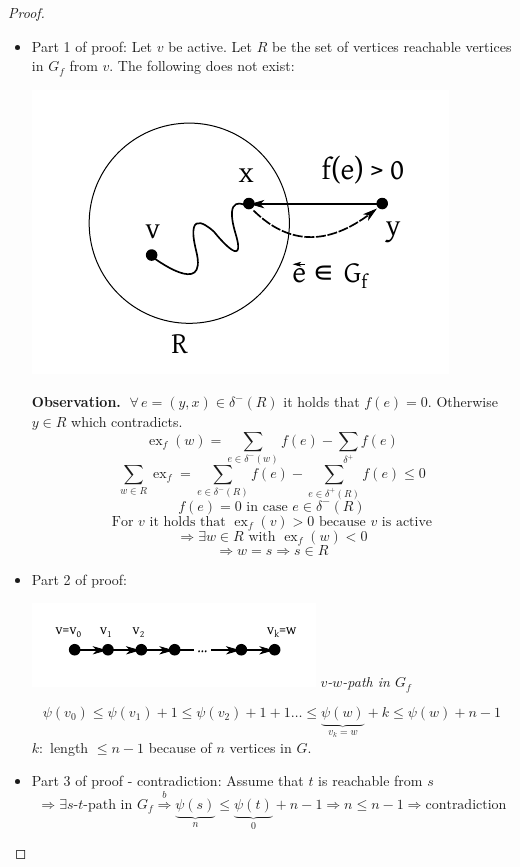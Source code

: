 \documentclass[a4paper]{article}
\theoremstyle{definition}
\newcommand{\gath}[2]{$#1$-$#2$-path} %
\newcommand{\fall}{\;\forall\,}
\begin{document}
\begin{proof}
  \begin{itemize}
    \item Part 1 of proof:
      Let $v$ be active. Let $R$ be the set of vertices reachable vertices in $G_f$ from $v$.
      The following does not exist:
      \begin{center}
        \includegraphics{img/lemma-4_9-proof-a.pdf}
      \end{center}

      \textbf{Observation.} $\fall e = (y, x) \in \delta^-(R)$ it holds that $f(e) = 0$. Otherwise $y \in R$ which contradicts.
      \[ \operatorname{ex}_f(w) = \sum_{e \in \delta^-(w)} f(e) - \sum_{\delta^+} f(e) \]
      \[ \sum_{w \in R} \operatorname{ex}_f = \sum_{e \in \delta^-(R)} f(e) - \sum_{e \in \delta^+(R)} f(e) \leq 0 \]
      \[ f(e) = 0 \text{ in case } e \in \delta^-(R) \]
      \[ \text{For $v$ it holds that } \operatorname{ex}_f(v) > 0 \text{ because $v$ is active} \]
      \[ \Rightarrow \exists w \in R \text{ with } \operatorname{ex}_f(w) < 0 \]
      \[ \Rightarrow w = s \Rightarrow s \in R \]
    \item Part 2 of proof:
      \begin{center}
        \includegraphics{img/lemma-4_9-proof-b.pdf}
        \textit{\gath vw in $G_f$}
      \end{center}
      \[
        \psi(v_0) \leq \psi(v_1) + 1
          \leq \psi(v_2) + 1 + 1 \dots
          \leq \underbrace{\psi(w)}_{v_k = w} + k
          \leq \psi(w) + n - 1
      \]
      $k:$ length $\leq n-1$ because of $n$ vertices in $G$.
    \item Part 3 of proof - contradiction: Assume that $t$ is reachable from $s$
      \[
        \Rightarrow \exists \text{\gath st in } G_f
        \stackrel{b}{\Rightarrow} \underbrace{\psi(s)}_{n} \leq \underbrace{\psi(t)}_{0} + n - 1
        \Rightarrow n \leq n - 1
        \Rightarrow \text{contradiction}
      \]
  \end{itemize}
\end{proof}
\end{document}
